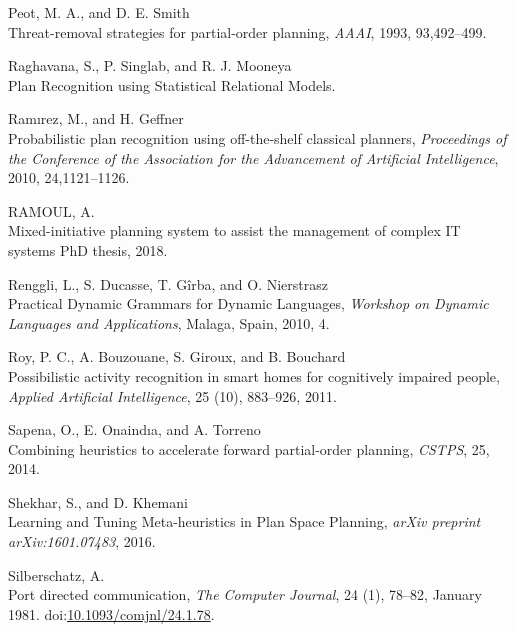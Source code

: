 \documentclass[11pt,a4paper,twoside,openright,titlepage,numbers=noenddot,headinclude,cleardoublepage=empty,openany]{scrreprt}
\theoremstyle{plain}
\theoremstyle{definition}
\theoremstyle{remark}
\begin{document}
\leavevmode\hypertarget{ref-peot_threatremoval_1993}{}%
Peot, M. A., and D. E. Smith\\
Threat-removal strategies for partial-order planning, \emph{AAAI}, 1993,
93,492--499.

\leavevmode\hypertarget{ref-raghavana_plan}{}%
Raghavana, S., P. Singlab, and R. J. Mooneya\\
Plan Recognition using Statistical Relational Models.

\leavevmode\hypertarget{ref-ramirez_probabilistic_2010}{}%
Ramırez, M., and H. Geffner\\
Probabilistic plan recognition using off-the-shelf classical planners,
\emph{Proceedings of the Conference of the Association for the
Advancement of Artificial Intelligence}, 2010, 24,1121--1126.

\leavevmode\hypertarget{ref-ramoul_mixedinitiative_2018}{}%
RAMOUL, A.\\
Mixed-initiative planning system to assist the management of complex IT
systems PhD thesis, 2018.

\leavevmode\hypertarget{ref-renggli_practical_2010}{}%
Renggli, L., S. Ducasse, T. Gîrba, and O. Nierstrasz\\
Practical Dynamic Grammars for Dynamic Languages, \emph{Workshop on
Dynamic Languages and Applications}, Malaga, Spain, 2010, 4.

\leavevmode\hypertarget{ref-roy_possibilistic_2011}{}%
Roy, P. C., A. Bouzouane, S. Giroux, and B. Bouchard\\
Possibilistic activity recognition in smart homes for cognitively
impaired people, \emph{Applied Artificial Intelligence}, 25 (10),
883--926, 2011.

\leavevmode\hypertarget{ref-sapena_combining_2014}{}%
Sapena, O., E. Onaindıa, and A. Torreno\\
Combining heuristics to accelerate forward partial-order planning,
\emph{CSTPS}, 25, 2014.

\leavevmode\hypertarget{ref-shekhar_learning_2016}{}%
Shekhar, S., and D. Khemani\\
Learning and Tuning Meta-heuristics in Plan Space Planning, \emph{arXiv
preprint arXiv:1601.07483}, 2016.

\leavevmode\hypertarget{ref-silberschatz_port_1981}{}%
Silberschatz, A.\\
Port directed communication, \emph{The Computer Journal}, 24 (1),
78--82, January 1981.
doi:\href{https://doi.org/10.1093/comjnl/24.1.78}{10.1093/comjnl/24.1.78}.
\end{document}
